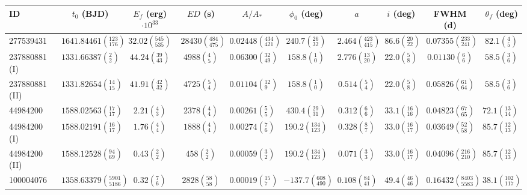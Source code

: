 \begin{tabular}{lccccccccr}
\hline\hline
             ID &                              $t_0$ (BJD) &      $E_{f}$ (erg)$\cdot 10^{33}$ &                          $ED$ (s) &                             $A/A_*$ &                     $\phi_0$ (deg) &                               $a$ &                      $i$ (deg) &                              FWHM (d) &                 $\theta_f$ (deg) \\
\hline
      277539431 &    $1641.84461\left(^{123}_{176}\right)$ &  $32.02\left(^{545}_{535}\right)$ &  $28430\left(^{484}_{475}\right)$ &  $0.02448\left(^{434}_{421}\right)$ &     $240.7\left(^{26}_{32}\right)$ &  $2.464\left(^{423}_{415}\right)$ &  $86.6\left(^{20}_{22}\right)$ &    $0.07355\left(^{233}_{241}\right)$ &      $82.1\left(^{4}_{5}\right)$ \\
  237880881 (I) &        $1331.66387\left(^{2}_{2}\right)$ &    $44.24\left(^{39}_{43}\right)$ &       $4988\left(^{4}_{5}\right)$ &    $0.06300\left(^{32}_{49}\right)$ &       $158.8\left(^{1}_{0}\right)$ &    $2.776\left(^{13}_{20}\right)$ &    $22.0\left(^{5}_{8}\right)$ &        $0.01130\left(^{6}_{6}\right)$ &      $58.5\left(^{3}_{6}\right)$ \\
 237880881 (II) &      $1331.82654\left(^{14}_{15}\right)$ &    $41.91\left(^{42}_{32}\right)$ &       $4725\left(^{5}_{4}\right)$ &     $0.01104\left(^{12}_{9}\right)$ &       $158.8\left(^{1}_{0}\right)$ &      $0.514\left(^{5}_{4}\right)$ &    $22.0\left(^{5}_{8}\right)$ &      $0.05826\left(^{61}_{64}\right)$ &      $58.5\left(^{3}_{6}\right)$ \\
       44984200 &      $1588.02563\left(^{17}_{17}\right)$ &       $2.21\left(^{4}_{3}\right)$ &       $2378\left(^{4}_{4}\right)$ &      $0.00261\left(^{5}_{5}\right)$ &     $430.4\left(^{29}_{31}\right)$ &      $0.312\left(^{6}_{6}\right)$ &  $33.1\left(^{16}_{16}\right)$ &      $0.04823\left(^{67}_{65}\right)$ &    $72.1\left(^{13}_{14}\right)$ \\
   44984200 (I) &      $1588.02191\left(^{16}_{17}\right)$ &       $1.76\left(^{4}_{4}\right)$ &       $1888\left(^{4}_{4}\right)$ &      $0.00274\left(^{7}_{6}\right)$ &   $190.2\left(^{134}_{123}\right)$ &      $0.328\left(^{8}_{7}\right)$ &  $33.0\left(^{16}_{17}\right)$ &      $0.03649\left(^{52}_{58}\right)$ &    $85.7\left(^{12}_{13}\right)$ \\
  44984200 (II) &      $1588.12528\left(^{94}_{69}\right)$ &       $0.43\left(^{2}_{2}\right)$ &        $458\left(^{2}_{2}\right)$ &      $0.00059\left(^{3}_{2}\right)$ &   $190.2\left(^{134}_{123}\right)$ &      $0.071\left(^{3}_{3}\right)$ &  $33.0\left(^{16}_{17}\right)$ &    $0.04096\left(^{216}_{210}\right)$ &    $85.7\left(^{12}_{13}\right)$ \\
      100004076 &  $1358.63379\left(^{5901}_{5186}\right)$ &       $0.32\left(^{7}_{6}\right)$ &     $2828\left(^{58}_{58}\right)$ &     $0.00019\left(^{15}_{7}\right)$ &  $-137.7\left(^{608}_{490}\right)$ &    $0.108\left(^{84}_{41}\right)$ &  $49.4\left(^{46}_{46}\right)$ &  $0.16432\left(^{8403}_{5583}\right)$ &  $38.1\left(^{102}_{117}\right)$ \\
\hline

\end{tabular}
